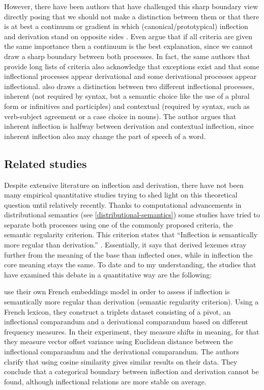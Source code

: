 \documentclass[12pt]{article}
\begin{document}
However, there have been authors that have challenged this sharp boundary view directly posing that we should not make a distinction between them \parencite{haspelmath2024InflectionDerivationTraditional} or that there is at best a continuum or gradient in which (canonical/prototypical) inflection and derivation stand on opposite sides \parencite{bybee1985MorphologyStudyRelation, stekauer2015DelimitationDerivationInflection}. Even \textcite{haspelmath2013UnderstandingMorphology} argue that if all criteria are given the same importance then a continuum is the best explanation, since we cannot draw a sharp boundary between both processes. In fact, the same authors that provide long lists of criteria also acknowledge that exceptions exist and that some inflectional processes appear derivational and some derivational processes appear inflectional. \textcite{booij2006InflectionDerivation} also draws a distinction between two different inflectional processes, inherent (not required by syntax, but a semantic choice like the use of a plural form or infinitives and participles) and contextual (required by syntax, such as verb-subject agreement or a case choice in nouns). The author argues that inherent inflection is halfway between derivation and contextual inflection, since inherent inflection also may change the part of speech of a word.

\subsection{Related studies}
Despite extensive literature on inflection and derivation, there have not been many empirical quantitative studies trying to shed light on this theoretical question until relatively recently. Thanks to computational advancements in distributional semantics (see \autoref{distributional-semantics}) some studies have tried to separate both processes using one of the commonly proposed criteria, the semantic regularity criterion. This criterion states that \enquote{Inflection is semantically more regular than derivation.} \parencite{stump2005WordFormationInflectionalMorphology}. Essentially, it says that derived lexemes stray further from the meaning of the base than inflected ones, while in inflection the core meaning stays the same. To date and to my understanding, the studies that have examined this debate in a quantitative way are the following:

\textcite{bonami2018InflectionVsDerivation} use their own French embeddings model in order to assess if inflection is semantically more regular than derivation (semantic regularity criterion). Using a French lexicon, they construct a triplets dataset consisting of a pivot, an inflectional comparandum and a derivational comparandum based on different frequency measures. In their experiment, they measure shifts in meaning, for that they measure vector offset variance using Euclidean distance between the inflectional comparandum and the derivational comparandum. The authors clarify that using cosine similarity gives similar results on their data. They conclude that a categorical boundary between inflection and derivation cannot be found, although inflectional relations are more stable on average.
\end{document}
